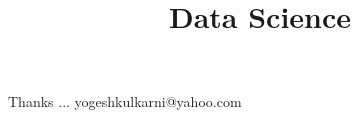 \documentclass[xcolor=dvipsnames,compress,t,pdf,9pt]{beamer}
\title[\insertframenumber /\inserttotalframenumber]{Data Science}
\begin{document}
	\begin{frame}
	\titlepage
	\end{frame}
	
	
	

	\begin{frame}[c]{}
	Thanks ...
	\vspace{5mm}
	yogeshkulkarni@yahoo.com
	\end{frame}
\end{document}
